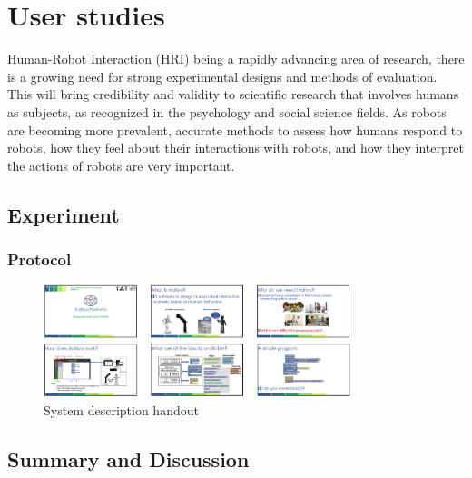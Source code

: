 
\chapter{User studies} %

\label{Chapter6} %

Human-Robot Interaction (HRI) being a rapidly advancing area of research, there is a growing need for strong experimental designs and methods of evaluation. This will bring credibility and validity to scientific research that involves humans as subjects, as recognized in the psychology and social science fields. As robots are becoming more prevalent, accurate methods to assess how humans respond to robots, how they feel about their interactions with robots, and how they interpret the actions of robots are very important. 

\section{Experiment}

\subsection{Protocol}
\begin{figure}[H]
\centering
\includegraphics[width=0.8\textwidth]{../thesis/assets/handout.png}
\caption[System description handout]{System description handout}
\label{fig:handout}
\end{figure}
\section{Summary and Discussion}